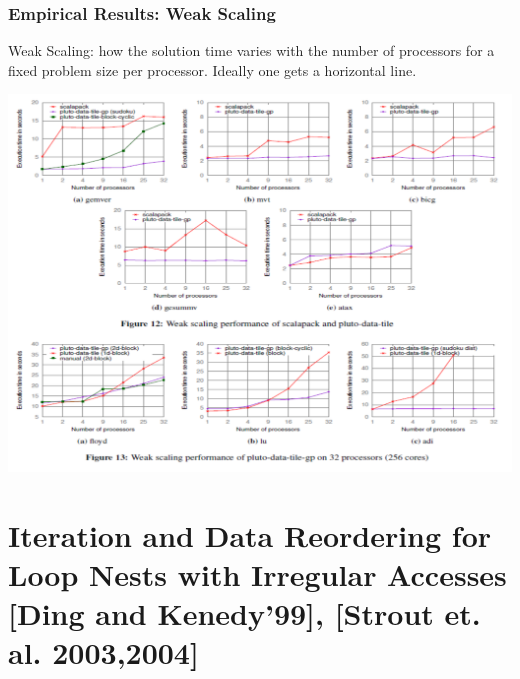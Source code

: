 \documentclass{beamer}
\newcommand{\emp}[1]{\textcolor{DikuRed}{ #1}}
\begin{document}
\begin{frame}[fragile,t]
  \frametitle{Empirical Results: Weak Scaling}

\begin{scriptsize}
\emp{Weak Scaling}: how the solution time varies with the 
            number of processors for a fixed problem size per processor.
            Ideally one gets a horizontal line.
\end{scriptsize}



\includegraphics[width=59ex]{ParTeaserFigs/WeakScaling}

\end{frame}


\section{Iteration and Data Reordering for Loop Nests with Irregular Accesses [Ding and Kenedy'99], [Strout et. al. 2003,2004]}

\begin{frame}[fragile]
	\tableofcontents[currentsection]
\end{frame}
\end{document}
